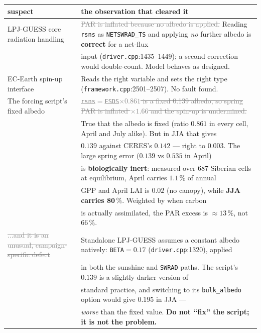 \documentclass[10pt]{article}
\newcommand{\dead}[1]{\textcolor{gray}{\sout{#1}}}
\begin{document}
\begin{center}\small
\begin{tabular}{l l}
\toprule
suspect & the observation that cleared it \\
\midrule
LPJ-GUESS core radiation handling &
\dead{PAR is inflated because no albedo is applied.} Reading \texttt{rsns} as
\texttt{NETSWRAD\_TS} and applying \emph{no} further albedo is \textbf{correct} for a net-flux \\
& input (\texttt{driver.cpp}:1435--1449); a second correction would double-count. Model behaves as designed. \\[2pt]
EC-Earth spin-up interface &
Reads the right variable and sets the right type (\texttt{framework.cpp}:2501--2507). No fault found. \\[2pt]
The forcing script's fixed albedo &
\dead{\texttt{rsns}$=$\texttt{FSDS}$\times0.861$ is a fixed 0.139 albedo, so spring PAR is inflated $\times1.66$
and the spin-up is undermined.} \\
& True that the albedo is fixed (ratio $0.861$ in every cell, April and July alike). But in JJA that gives \\
& $0.139$ against CERES's $\mathbf{0.142}$ --- right to $0.003$. The large spring error
($0.139$ vs $0.535$ in April) \\
& is \textbf{biologically inert}: measured over 687 Siberian cells at equilibrium, April carries
$\mathbf{1.1\,\%}$ of annual \\
& GPP and April LAI is $0.02$ (no canopy), while \textbf{JJA carries $\mathbf{80\,\%}$}. Weighted by when carbon \\
& is actually assimilated, the PAR excess is $\approx13\,\%$, not $66\,\%$. \\[2pt]
\dead{...and it is an unusual, campaign-specific defect} &
Standalone LPJ-GUESS assumes a constant albedo natively: \texttt{BETA}$=0.17$
(\texttt{driver.cpp}:1320), applied \\
& in both the sunshine and \texttt{SWRAD} paths. The script's $0.139$ is a slightly darker version of \\
& standard practice, and switching to its \texttt{bulk\_albedo} option would give $0.195$ in JJA --- \\
& \emph{worse} than the fixed value. \textbf{Do not ``fix'' the script; it is not the problem.} \\
\bottomrule
\end{tabular}
\end{center}
\end{document}
